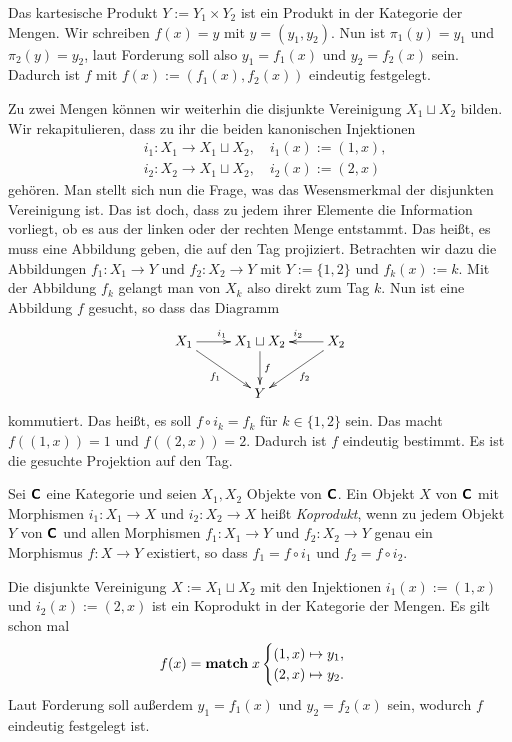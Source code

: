 \noindent
Das kartesische Produkt $Y:=Y_1\times Y_2$ ist ein Produkt in
der Kategorie der Mengen. Wir schreiben $f(x)=y$ mit $y=(y_1,y_2)$.
Nun ist $\pi_1(y)=y_1$ und $\pi_2(y)=y_2$, laut Forderung soll also
$y_1=f_1(x)$ und $y_2=f_2(x)$ sein. Dadurch ist $f$ mit
$f(x):=(f_1(x),f_2(x))$ eindeutig festgelegt.

Zu zwei Mengen können wir weiterhin die disjunkte Vereinigung
$X_1\sqcup X_2$ bilden. Wir rekapitulieren, dass zu ihr die beiden
kanonischen Injektionen
\begin{align*}
& i_1\colon X_1\to X_1\sqcup X_2,\quad i_1(x) := (1,x),\\
& i_2\colon X_2\to X_1\sqcup X_2,\quad i_2(x) := (2,x)
\end{align*}
gehören. Man stellt sich nun die Frage, was das Wesensmerkmal
der disjunkten Vereinigung ist. Das ist doch, dass zu jedem ihrer
Elemente die Information vorliegt, ob es aus der linken oder der
rechten Menge entstammt. Das heißt, es muss eine Abbildung geben,
die auf den Tag projiziert. Betrachten wir dazu die Abbildungen
$f_1\colon X_1\to Y$ und $f_2\colon X_2\to Y$ mit $Y:=\{1,2\}$ und
$f_k(x):=k$. Mit der Abbildung $f_k$ gelangt man von $X_k$ also
direkt zum Tag $k$. Nun ist eine Abbildung $f$ gesucht, so dass das
Diagramm
\[\xymatrix{
X_1\ar[r]^{i_1}\ar[dr]_{f_1} & X_1\sqcup X_2\ar[d]^{f}
& X_2\ar[l]_{i_2}\ar[dl]^{f_2}\\
& Y &
}\]
kommutiert. Das heißt, es soll $f\circ i_k = f_k$ für $k\in\{1,2\}$ sein.
Das macht $f((1,x)) = 1$ und $f((2,x)) = 2$. Dadurch ist $f$ eindeutig
bestimmt. Es ist die gesuchte Projektion auf den Tag.

\begin{Definition}[Koprodukt]\newlinefirst
Sei $\textsf{\textbf{C}}$ eine Kategorie und seien $X_1,X_2$ Objekte von
$\textsf{\textbf{C}}$. Ein Objekt $X$ von $\textsf{\textbf{C}}$ mit Morphismen
$i_1\colon X_1\to X$ und $i_2\colon X_2\to X$ heißt \emph{Koprodukt},
wenn zu jedem Objekt $Y$ von $\textsf{\textbf{C}}$ und allen
Morphismen $f_1\colon X_1\to Y$ und $f_2\colon X_2\to Y$ genau ein
Morphismus $f\colon X\to Y$ existiert, so dass $f_1 = f\circ i_1$
und $f_2 = f\circ i_2$.
\end{Definition}

\noindent
Die disjunkte Vereinigung $X:=X_1\sqcup X_2$ mit den Injektionen
$i_1(x):=(1,x)$ und $i_2(x):=(2,x)$ ist ein Koprodukt in der
Kategorie der Mengen. Es gilt schon mal
\[f(x) = \textbf{match}\; x \begin{cases}
(1,x)\mapsto y_1,\\
(2,x)\mapsto y_2.
\end{cases}\]
Laut Forderung soll außerdem $y_1 = f_1(x)$ und $y_2 = f_2(x)$ sein,
wodurch $f$ eindeutig festgelegt ist.

